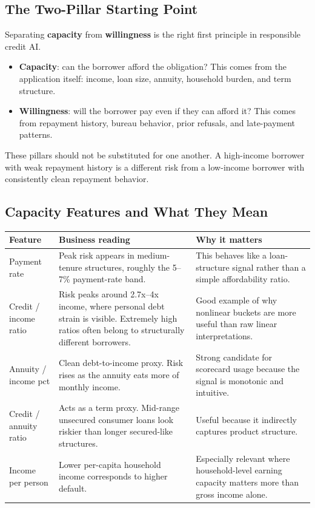 \documentclass[11pt]{article}
\begin{document}
\subsection{The Two-Pillar Starting Point}

Separating \textbf{capacity} from \textbf{willingness} is the right first principle in responsible credit AI.

\begin{itemize}
  \item \textbf{Capacity}: can the borrower afford the obligation? This comes from the application itself: income, loan size, annuity, household burden, and term structure.
  \item \textbf{Willingness}: will the borrower pay even if they can afford it? This comes from repayment history, bureau behavior, prior refusals, and late-payment patterns.
\end{itemize}

These pillars should not be substituted for one another. A high-income borrower with weak repayment history is a different risk from a low-income borrower with consistently clean repayment behavior.

\subsection{Capacity Features and What They Mean}

{\small
\begin{tabularx}{\textwidth}{@{}P{0.26\textwidth}P{0.35\textwidth}Y@{}}
\toprule
Feature & Business reading & Why it matters \\
\midrule
Payment rate & Peak risk appears in medium-tenure structures, roughly the 5--7\% payment-rate band. & This behaves like a loan-structure signal rather than a simple affordability ratio. \\
Credit / income ratio & Risk peaks around 2.7x--4x income, where personal debt strain is visible. Extremely high ratios often belong to structurally different borrowers. & Good example of why nonlinear buckets are more useful than raw linear interpretations. \\
Annuity / income pct & Clean debt-to-income proxy. Risk rises as the annuity eats more of monthly income. & Strong candidate for scorecard usage because the signal is monotonic and intuitive. \\
Credit / annuity ratio & Acts as a term proxy. Mid-range unsecured consumer loans look riskier than longer secured-like structures. & Useful because it indirectly captures product structure. \\
Income per person & Lower per-capita household income corresponds to higher default. & Especially relevant where household-level earning capacity matters more than gross income alone. \\
\bottomrule
\end{tabularx}
}
\end{document}

